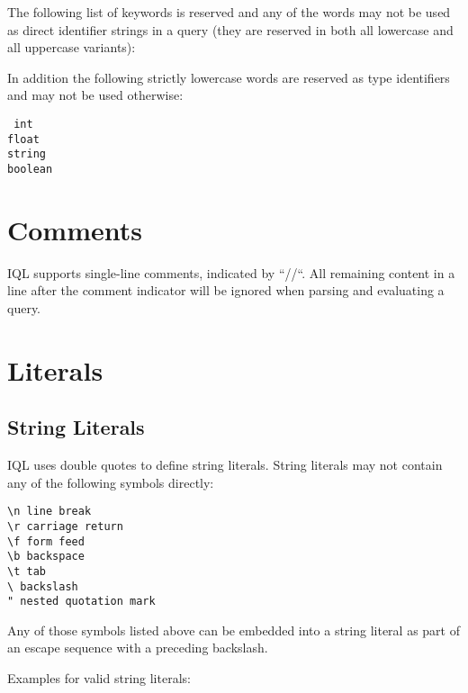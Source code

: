 \documentclass[11pt]{article}
\begin{document}
The following list of keywords is reserved and any of the words may not be used as direct identifier strings in a query (they are reserved in both all lowercase and all uppercase variants):

In addition the following strictly lowercase words are reserved as type identifiers and may not be used otherwise:

\begin{multicols}{3}
\parindent=0pt
\texttt{%
int\\
float\\
string\\
boolean\\
}
\end{multicols}

\section{Comments}
\label{sec:comments}

IQL supports single-line comments, indicated by ``//``. All remaining content in a line after the comment indicator will be ignored when parsing and evaluating a query.

\section{Literals}
\label{sec:literals}

\subsection{String Literals}
\label{sec:string-literals}

IQL uses double quotes to define string literals. String literals may not contain any of the following symbols directly:

\begin{verbatim}
\n line break
\r carriage return
\f form feed
\b backspace
\t tab
\ backslash
" nested quotation mark
\end{verbatim}

Any of those symbols listed above can be embedded into a string literal as part of an escape sequence with a preceding backslash.

Examples for valid string literals:
\end{document}
